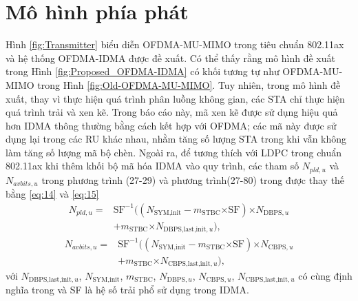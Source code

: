 \section{Mô hình phía phát}

Hình \ref{fig:Transmitter} biểu diễn OFDMA-MU-MIMO trong tiêu chuẩn 802.11ax và hệ thống OFDMA-IDMA được đề xuất. Có thể thấy rằng mô hình đề xuất trong Hình \ref{fig:Proposed_OFDMA-IDMA} có khối tương tự như OFDMA-MU-MIMO trong Hình \ref{fig:Old-OFDMA-MU-MIMO}. Tuy nhiên, trong mô hình đề xuất, thay vì thực hiện quá trình phân luồng không gian, các STA chỉ thực hiện quá trình trải và xen kẽ.
Trong báo cáo này, mã xen kẽ được sử dụng hiệu quả hơn IDMA thông thường bằng cách kết hợp với OFDMA; các mã này được sử dụng lại trong các RU khác nhau, nhằm tăng số lượng STA trong khi vẫn không làm tăng số lượng mã bộ chèn.
Ngoài ra, để tương thích với LDPC trong chuẩn 802.11ax khi thêm khối bộ mã hóa IDMA vào quy trình, các tham số $N_{pld,u}$ và $N_{avbits,u}$ trong phương trình (27-29) và phương trình(27-80) trong \cite{IEEEStd} được thay thế bằng \eqref{eq:14} và \eqref{eq:15}
\begin{equation}
	\begin{split}
		N_{pld,u} = &{\text{SF}}^{-1}((N_{\text{SYM,init}}-m_{\text{STBC}} \mathord{\times} \text{SF}) \mathord{\times} N_{\text{DBPS},u} \\
		&+ m_{\text{STBC}} \mathord{\times} N_{\text{DBPS,last,init},u}),
	\end{split}
	\label{eq:14}
\end{equation}
\begin{equation}
	\begin{split}
		N_{avbits,u} = &{\text{SF}}^{-1}((N_{\text{SYM,init}}-m_{\text{STBC}} \mathord{\times} \text{SF}) \mathord{\times} N_{\text{CBPS},u} \\
		&+ m_{\text{STBC}} \mathord{\times} N_{\text{CBPS,last,init},u}),
	\end{split}
	\label{eq:15}
\end{equation}
với $N_{\text{DBPS,last,init},u}$, $N_\text{SYM,init}$, $m_{\text{STBC}}$, $N_{\text{DBPS}, u}$, $N_{\text{CBPS},u}$, $N_{\text{CBPS,last,init},u}$ có cùng định nghĩa trong \cite{IEEEStd} và SF là hệ số trải phổ sử dụng trong IDMA.
